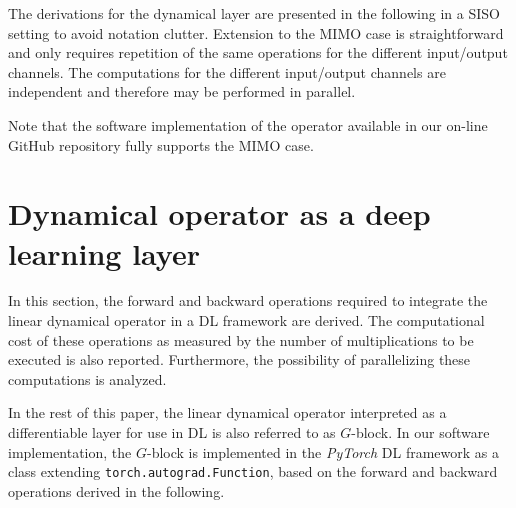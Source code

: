 \documentclass{article}
\begin{document}
The derivations for the dynamical layer are presented in the following in a SISO setting to avoid notation clutter. Extension to the MIMO case is  straightforward and  only requires repetition of the same operations for the different input/output channels. 
The computations for the different input/output channels are independent and therefore  may be performed in parallel. 

Note that the software implementation of the operator available in our on-line GitHub repository fully supports the MIMO case.

\section{Dynamical operator as a deep learning layer}
\label{sec:layer_DL}

In this section, the forward and backward operations required to integrate the linear dynamical operator in a DL framework are derived. The computational cost of these operations as measured by the number of multiplications to be executed is also reported.  Furthermore, the possibility of parallelizing these computations is analyzed.

In the rest of this paper, the linear dynamical operator interpreted as a differentiable layer for use in DL is also referred to as $G$-block. In our software implementation, the $G$-block is implemented in the \emph{PyTorch} DL framework
as a class extending \texttt{torch.autograd.Function}, based on the forward and backward operations derived in the following.
\end{document}

